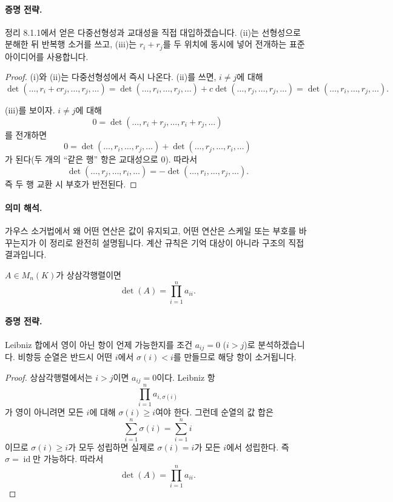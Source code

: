 \paragraph{증명 전략.}
정리 8.1.1에서 얻은 다중선형성과 교대성을 직접 대입하겠습니다. (ii)는 선형성으로 분해한 뒤 반복행 소거를 쓰고, (iii)는 $r_i+r_j$를 두 위치에 동시에 넣어 전개하는 표준 아이디어를 사용합니다.

\begin{proof}
(i)와 (ii)는 다중선형성에서 즉시 나온다. (ii)를 쓰면, $i\ne j$에 대해
$$
\det(\dots,r_i+cr_j,\dots,r_j,\dots)
=\det(\dots,r_i,\dots,r_j,\dots)+c\det(\dots,r_j,\dots,r_j,\dots)
=\det(\dots,r_i,\dots,r_j,\dots).
$$

(iii)를 보이자. $i\ne j$에 대해
$$
0=\det(\dots,r_i+r_j,\dots,r_i+r_j,\dots)
$$
를 전개하면
$$
0=\det(\dots,r_i,\dots,r_j,\dots)+\det(\dots,r_j,\dots,r_i,\dots)
$$
가 된다(두 개의 ``같은 행'' 항은 교대성으로 $0$). 따라서
$$
\det(\dots,r_j,\dots,r_i,\dots)=-\det(\dots,r_i,\dots,r_j,\dots).
$$
즉 두 행 교환 시 부호가 반전된다.
\end{proof}

\paragraph{의미 해석.}
가우스 소거법에서 왜 어떤 연산은 값이 유지되고, 어떤 연산은 스케일 또는 부호를 바꾸는지가 이 정리로 완전히 설명됩니다. 계산 규칙은 기억 대상이 아니라 구조의 직접 결과입니다.

\begin{theorem}
$A\in M_n(K)$가 상삼각행렬이면
$$
\det(A)=\prod_{i=1}^n a_{ii}.
$$
\end{theorem}

\paragraph{증명 전략.}
Leibniz 합에서 영이 아닌 항이 언제 가능한지를 조건 $a_{ij}=0$ ($i>j$)로 분석하겠습니다. 비항등 순열은 반드시 어떤 $i$에서 $\sigma(i)<i$를 만들므로 해당 항이 소거됩니다.

\begin{proof}
상삼각행렬에서는 $i>j$이면 $a_{ij}=0$이다. Leibniz 항
$$
\prod_{i=1}^n a_{i,\sigma(i)}
$$
가 영이 아니려면 모든 $i$에 대해 $\sigma(i)\ge i$여야 한다. 그런데 순열의 값 합은
$$
\sum_{i=1}^n \sigma(i)=\sum_{i=1}^n i
$$
이므로 $\sigma(i)\ge i$가 모두 성립하면 실제로 $\sigma(i)=i$가 모든 $i$에서 성립한다. 즉 $\sigma=\operatorname{id}$만 가능하다. 따라서
$$
\det(A)=\prod_{i=1}^n a_{ii}.
$$
\end{proof}


